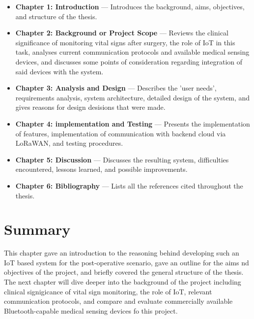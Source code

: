 \begin{itemize}
	\item \textbf{Chapter 1: Introduction} --- Introduces the background, aims, objectives, and structure of the thesis.
	\item \textbf{Chapter 2: Background or Project Scope} --- Reviews the clinical significance of monitoring vital signs after surgery, the role of IoT in this task, analyses current communication protocols and available medical sensing devices, and discusses some points of consideration regarding integration of said devices with the system.
	\item \textbf{Chapter 3: Analysis and Design} --- Describes the 'user needs', requirements analysis, system architecture, detailed design of the system, and gives reasons for design desisions that were made.
	\item \textbf{Chapter 4: implementation and Testing} --- Presents the implementation of features, implementation of communication with backend cloud via LoRaWAN, and testing procedures.
	\item \textbf{Chapter 5: Discussion} --- Discusses the resulting system, difficulties encountered, lessons learned, and possible improvements.
	\item \textbf{Chapter 6: Bibliography} --- Lists all the references cited throughout the thesis.
\end{itemize}

\section{Summary} %
This chapter gave an introduction to the reasoning behind developing such an IoT based system for the post-operative scenario, gave an outline for the aims nd objectives of the project, and briefly covered the general structure of the thesis. The next chapter will dive deeper into the background of the project including clinical signigicance of vital sign monitoring, the role of IoT, relevant communication protocols, and compare and evaluate commercially available Bluetooth-capable medical sensing devices fo this project.
